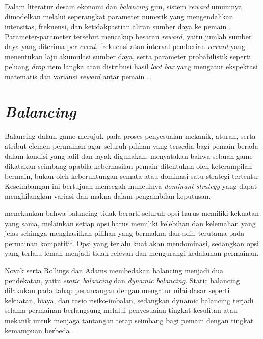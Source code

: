 Dalam literatur desain ekonomi dan \textit{balancing} gim, sistem \textit{reward} umumnya 
dimodelkan melalui seperangkat parameter numerik yang mengendalikan intensitas, 
frekuensi, dan ketidakpastian aliran sumber daya ke pemain \citep{Rupp_2024}. 
Parameter-parameter tersebut mencakup besaran \textit{reward}, 
yaitu jumlah sumber daya yang diterima per \textit{event}, frekuensi atau interval 
pemberian \textit{reward} yang menentukan laju akumulasi sumber daya, serta parameter probabilistik 
seperti peluang \textit{drop} item langka atau distribusi hasil \textit{loot box} yang 
mengatur ekspektasi matematis dan variansi \textit{reward} antar pemain \citep{Clark2023}.

\section{\textit{Balancing}}\label{}
Balancing dalam game merujuk pada proses penyesuaian mekanik, aturan, serta atribut elemen permainan agar seluruh pilihan yang tersedia bagi pemain berada dalam kondisi yang adil dan layak digunakan. \cite{RollingsAdams2003} menyatakan bahwa sebuah game dikatakan seimbang apabila keberhasilan pemain ditentukan oleh keterampilan bermain, bukan oleh keberuntungan semata atau dominasi satu strategi tertentu. Keseimbangan ini bertujuan mencegah munculnya \textit{dominant strategy} yang dapat menghilangkan variasi dan makna dalam pengambilan keputusan.

\cite{Sirlin2016} menekankan bahwa balancing tidak berarti seluruh opsi harus memiliki kekuatan yang sama, melainkan setiap opsi harus memiliki kelebihan dan kelemahan yang jelas sehingga menghasilkan pilihan yang bermakna dan adil, terutama pada permainan kompetitif. Opsi yang terlalu kuat akan mendominasi, sedangkan opsi yang terlalu lemah menjadi tidak relevan dan mengurangi kedalaman permainan.

Novak serta Rollings dan Adams membedakan balancing menjadi dua pendekatan, yaitu \textit{static balancing} dan \textit{dynamic balancing}. Static balancing dilakukan pada tahap perancangan dengan mengatur nilai dasar seperti kekuatan, biaya, dan rasio risiko-imbalan, sedangkan dynamic balancing terjadi selama permainan berlangsung melalui penyesuaian tingkat kesulitan atau mekanik untuk menjaga tantangan tetap seimbang bagi pemain dengan tingkat kemampuan berbeda \cite{Novak2012}.



